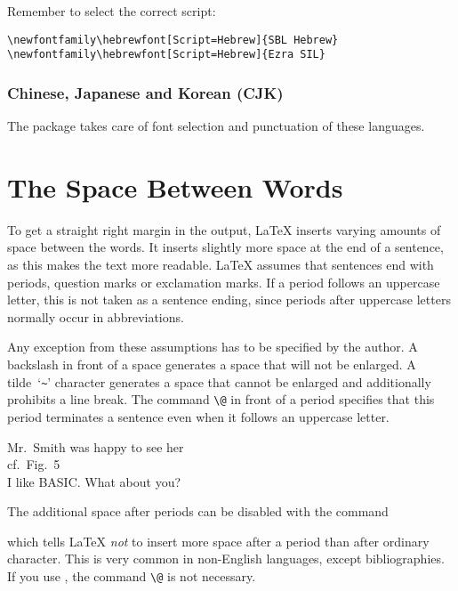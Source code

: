 Remember to select the correct script:

\begin{lscommand}
\verb|\newfontfamily\hebrewfont[Script=Hebrew]{SBL Hebrew}| \\
\verb|\newfontfamily\hebrewfont[Script=Hebrew]{Ezra SIL}|
\end{lscommand}


\subsubsection{Chinese, Japanese and Korean (CJK)}

The package \cite{xecjk} takes care of font selection and
punctuation of these languages.

\section{The Space Between Words}

To get a straight right margin in the output, \LaTeX{} inserts varying
amounts of space between the words. It inserts slightly more space at
the end of a sentence, as this makes the text more readable.  \LaTeX{}
assumes that sentences end with periods, question marks or exclamation
marks. If a period follows an uppercase letter, this is not taken as a
sentence ending, since periods after uppercase letters normally occur in
abbreviations.

Any exception from these assumptions has to be specified by the
author. A backslash in front of a space generates a space that will
not be enlarged. A tilde~`\verb|~|' character generates a space that cannot be
enlarged and additionally prohibits a line break. The command
\verb|\@| in front of a period specifies that this period terminates a
sentence even when it follows an uppercase letter.
  

\begin{example}
Mr.~Smith was happy to see her\\
cf.~Fig.~5\\
I like BASIC\@. What about you?
\end{example}

The additional space after periods can be disabled with the command
\begin{lscommand}
\end{lscommand}
\noindent which tells \LaTeX{} \emph{not} to insert more space after a
period than after ordinary character. This is very common in
non-English languages, except bibliographies. If you use
, the command \verb|\@| is not necessary.

